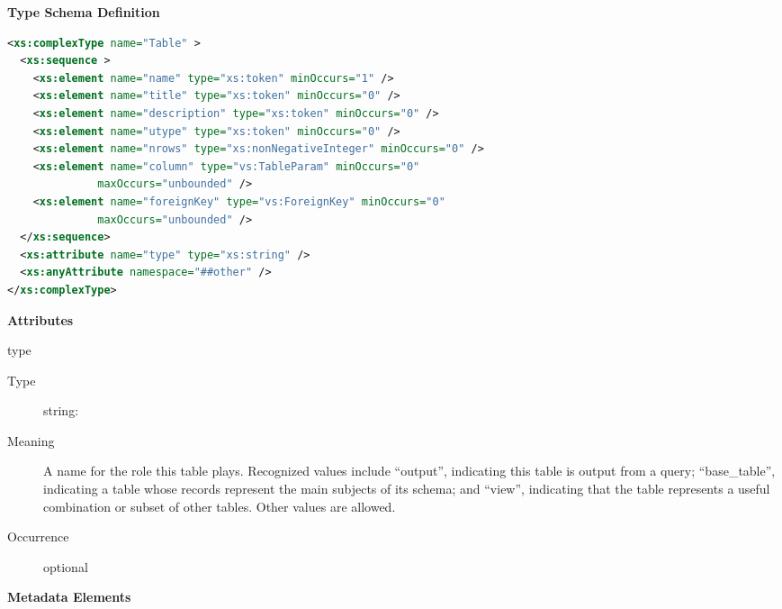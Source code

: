 \documentclass[11pt,a4paper]{ivoa}
\begin{document}
\begin{generated}
\begingroup
        \renewcommand*\descriptionlabel[1]{%
        \hbox to 5.5em{\emph{#1}\hfil}}\vspace{1ex}\noindent\textbf{ Type Schema Definition}

\begin{lstlisting}[language=XML,basicstyle=\footnotesize]
<xs:complexType name="Table" >
  <xs:sequence >
    <xs:element name="name" type="xs:token" minOccurs="1" />
    <xs:element name="title" type="xs:token" minOccurs="0" />
    <xs:element name="description" type="xs:token" minOccurs="0" />
    <xs:element name="utype" type="xs:token" minOccurs="0" />
    <xs:element name="nrows" type="xs:nonNegativeInteger" minOccurs="0" />
    <xs:element name="column" type="vs:TableParam" minOccurs="0"
              maxOccurs="unbounded" />
    <xs:element name="foreignKey" type="vs:ForeignKey" minOccurs="0"
              maxOccurs="unbounded" />
  </xs:sequence>
  <xs:attribute name="type" type="xs:string" />
  <xs:anyAttribute namespace="##other" />
</xs:complexType>
\end{lstlisting}

\vspace{0.5ex}\noindent\textbf{ Attributes}

\begingroup\small\begin{bigdescription}
\item[type]
\begin{description}
\item[Type] string: 
\item[Meaning] A name for the role this table plays.  Recognized
               values include “output”, indicating this table is output
               from a query; “base\_table”, indicating a table
               whose records represent the main subjects of its
               schema; and “view”, indicating that the table represents
               a useful combination or subset of other tables.  Other
               values are allowed.
\item[Occurrence] optional
\end{description}


\end{bigdescription}\endgroup



\vspace{0.5ex}\noindent\textbf{ Metadata Elements}


\end{generated}
\end{document}
